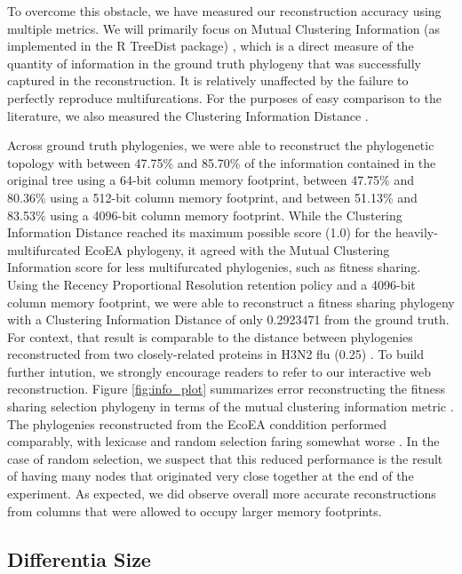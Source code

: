 To overcome this obstacle, we have measured our reconstruction accuracy using multiple metrics.
We will primarily focus on Mutual Clustering Information (as implemented in the R TreeDist package) \citep{smith2020treedist}, which is a direct measure of the quantity of information in the ground truth phylogeny that was successfully captured in the reconstruction.
It is relatively unaffected by the failure to perfectly reproduce multifurcations.
For the purposes of easy comparison to the literature, we also measured the Clustering Information Distance \citep{smith2020treedist}.



Across ground truth phylogenies, we were able to reconstruct the phylogenetic topology with between 47.75\% and 85.70\% of the information contained in the original tree using a 64-bit column memory footprint, between 47.75\% and 80.36\% using a 512-bit column memory footprint, and between 51.13\% and 83.53\% using a 4096-bit column memory footprint.
While the Clustering Information Distance reached its maximum possible score (1.0) for the heavily-multifurcated EcoEA phylogeny, it agreed with the Mutual Clustering Information score for less multifurcated phylogenies, such as fitness sharing.
Using the Recency Proportional Resolution retention policy and a 4096-bit column memory footprint, we were able to reconstruct a fitness sharing phylogeny with a Clustering Information Distance of only 0.2923471 from the ground truth.
For context, that result is comparable to the distance between phylogenies reconstructed from two closely-related proteins in H3N2 flu (0.25) \citep{jones2021parallel}.
To build further intution, we strongly encourage readers to refer to our interactive web reconstruction.
Figure \ref{fig:info_plot} summarizes error reconstructing the fitness sharing selection phylogeny in terms of the mutual clustering information metric \citep{smith2022robust}.
The phylogenies reconstructed from the EcoEA conddition performed comparably, with lexicase and random selection faring somewhat worse \citep{moreno2022hstratconceptsupplement}. %
In the case of random selection, we suspect that this reduced performance is the result of having many nodes that originated very close together at the end of the experiment.
As expected, we did observe overall more accurate reconstructions from columns that were allowed to occupy larger memory footprints.

\subsection{Differentia Size}

